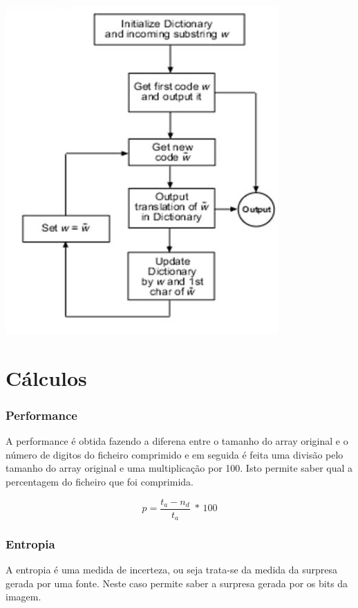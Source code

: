 \documentclass[12pt]{article}
\begin{document}
\begin{center}
\includegraphics[scale=0.7]{descompressor.png}\\[2cm]
\end{center}	

\newpage
{}

\printindex
\section{Cálculos}
\printindex
\subsubsection{Performance}
A performance é obtida fazendo a diferena entre o tamanho do array original e o número de digitos do ficheiro comprimido e em seguida é feita uma divisão pelo tamanho do array original e uma multiplicação por 100. Isto permite saber qual a percentagem do ficheiro que foi comprimida.

\begin{center}
\[ p = \frac{t_{a}-n_{d}}{t_{a}}\ \ \textrm{* 100}  \]
\end{center}

\printindex
\subsubsection{Entropia}
A entropia é uma medida de incerteza, ou seja trata-se da medida da surpresa gerada por uma fonte. Neste caso permite saber a surpresa gerada por os bits da imagem.
\end{document}

